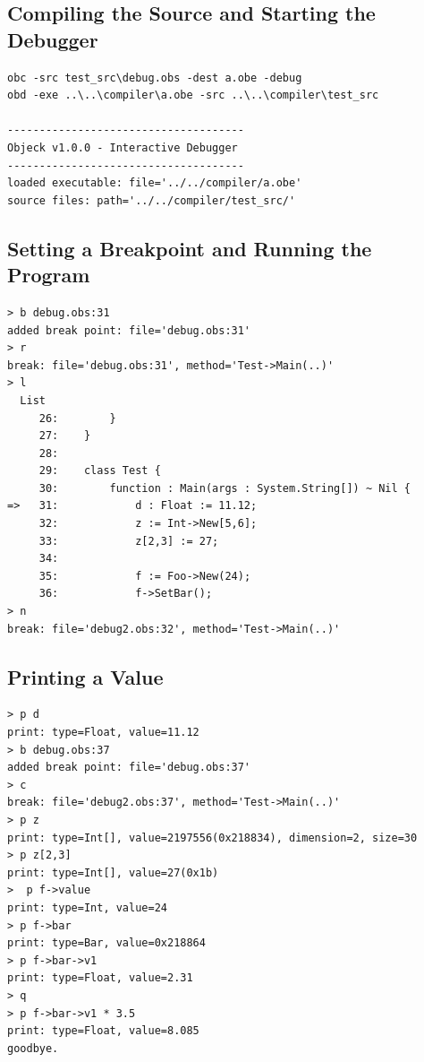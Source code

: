 \documentclass[12pt]{article}
\begin{document}
\subsection{Compiling the Source and Starting the Debugger}
\begin{verbatim}
obc -src test_src\debug.obs -dest a.obe -debug
obd -exe ..\..\compiler\a.obe -src ..\..\compiler\test_src

-------------------------------------
Objeck v1.0.0 - Interactive Debugger
-------------------------------------
loaded executable: file='../../compiler/a.obe'
source files: path='../../compiler/test_src/'
\end{verbatim}

\subsection{Setting a Breakpoint and Running the Program}
\begin{verbatim}
> b debug.obs:31
added break point: file='debug.obs:31'
> r
break: file='debug.obs:31', method='Test->Main(..)'
> l
  List
     26: 		}
     27: 	}
     28: 
     29: 	class Test {
     30: 		function : Main(args : System.String[]) ~ Nil {
=>   31: 			d : Float := 11.12;
     32: 			z := Int->New[5,6];	
     33: 			z[2,3] := 27;
     34: 
     35: 			f := Foo->New(24);
     36: 			f->SetBar();
> n
break: file='debug2.obs:32', method='Test->Main(..)'
\end{verbatim}

\subsection{Printing a Value}
\begin{verbatim}
> p d
print: type=Float, value=11.12
> b debug.obs:37
added break point: file='debug.obs:37'
> c
break: file='debug2.obs:37', method='Test->Main(..)'
> p z
print: type=Int[], value=2197556(0x218834), dimension=2, size=30
> p z[2,3]
print: type=Int[], value=27(0x1b)
>  p f->value
print: type=Int, value=24
> p f->bar
print: type=Bar, value=0x218864
> p f->bar->v1
print: type=Float, value=2.31
> q
> p f->bar->v1 * 3.5
print: type=Float, value=8.085
goodbye.
\end{verbatim}
\end{document}
